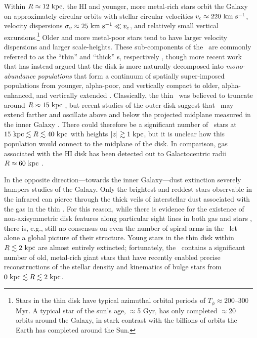 
Within $R\approx 12~\mathrm{kpc}$, the HI and younger, more metal-rich stars orbit the
Galaxy on approximately circular orbits with stellar circular velocities $v_c
\approx 220~\mathrm{km}~\mathrm{s}^{-1}$, velocity dispersions $\sigma_v \approx 25~\mathrm{km}~\mathrm{s}^{-1} \ll v_c$, and
relatively small vertical excursions.\footnote{Stars in the thin disk have
typical azimuthal orbital periods of $T_\phi \approx 200$--300 Myr. A typical
star of the sun's age, $\approx$5 Gyr, has only completed $\approx$20 orbits
around the Galaxy, in stark contrast with the billions of orbits the Earth has
completed around the Sun.} Older and more metal-poor stars tend to have larger
velocity dispersions and larger scale-heights. These sub-components of the
\mwdisk\ are commonly referred to as the ``thin'' and ``thick'' \mwdisk s,
respectively \citep{gilmore83}, though more recent work that has instead argued
that the disk is more naturally decomposed into \emph{mono-abundance
populations} that form a continuum of spatially super-imposed populations from
younger, alpha-poor, and vertically compact to older, alpha-enhanced, and
vertically extended \citep[see, e.g., Figure~12 and Section~6 in][]{rixbovy13,
bovy12-nothickdisk}. Classically, the thin \mwdisk\ was believed to truncate
around $R \approx 15~\mathrm{kpc}$ \citep[e.g.,][]{robin92}, but recent studies of the
outer disk suggest that \mwdisk\ may extend farther and oscillate above and
below the projected midplane measured in the inner Galaxy \citep{xu15,
apw15-triand}. There could therefore be a significant number of \mwdisk\ stars
at $15~\mathrm{kpc} \lesssim R \lesssim 40~\mathrm{kpc}$ with heights $|z| \gtrsim 1~\mathrm{kpc}$, but
it is unclear how this population would connect to the midplane of the disk. In
comparison, gas associated with the HI disk has been detected out to
Galactocentric radii $R \approx 60~\mathrm{kpc}$ \citep{kalberla08}.

In the opposite direction---towards the inner Galaxy---dust extinction severely
hampers studies of the Galaxy. Only the brightest and reddest stars observable
in the infrared can pierce through the thick veils of interstellar dust
associated with the gas in the thin \mwdisk. For this reason, while there is
evidence for the existence of non-axisymmetric disk features along particular
sight lines in both gas and stars \citep[e.g.,][]{levine06, reid14}, there is,
e.g., still no consensus on even the number of spiral arms in the \mwdisk\ let
alone a global picture of their structure. Young stars in the thin disk within
$R \lesssim 2~\mathrm{kpc}$ are almost entirely extincted; fortunately, the \mwbulge\
contains a significant number of old, metal-rich giant stars that have recently
enabled precise reconstructions of the stellar density and kinematics of bulge
stars from $0~\mathrm{kpc} \lesssim R \lesssim 2~\mathrm{kpc}$.

